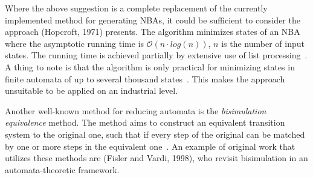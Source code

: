 Where the above suggestion is a complete replacement of the currently implemented method for generating NBAs, it could be sufficient to consider the approach (Hopcroft, 1971)\cite{hopcroft1971n} presents. The algorithm minimizes states of an NBA where the asymptotic running time is $\mathcal{O}(n \cdot log(n))$, $n$ is the number of input states. The running time is achieved partially by extensive use of list processing~\cite{hopcroft1971n}. A thing to note is that the algorithm is only practical for minimizing states in finite automata of up to several thousand states~\cite{hopcroft1971n}. This makes the approach unsuitable to be applied on an industrial level.

Another well-known method for reducing automata is the \emph{bisimulation equivalence} method. The method aims to construct an equivalent transition system to the original one, such that if every step of the original can be matched by one or more steps in the equivalent one~\cite{baier2008principles}. An example of original work that utilizes these methods are (Fisler and Vardi, 1998)\cite{fisler1998a}, who revisit bisimulation in an automata-theoretic framework.

